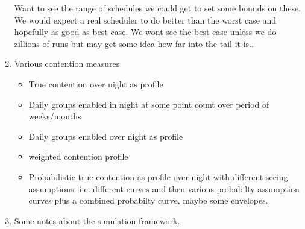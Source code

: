 \begin{enumerate}
Want to see the range of schedules we could get to set some bounds on these. We would expect a real scheduler to do better than the worst case and hopefully as good as best case. We wont see the best case unless we do zillions of runs but may get some idea how far into the tail it is..

\item Various contention measures

\begin{itemize}
\item True contention over night as profile
\item Daily groups enabled in night at some point count over period of weeks/months
\item Daily groups enabled over night as profile
\item weighted contention profile
\item Probabilistic true contention as profile over night with different seeing assumptions -i.e. different curves and then various probabilty assumption curves plus a combined probabilty curve, maybe some envelopes.
\end{itemize}


\item Some notes about the simulation framework.

\end{enumerate}

